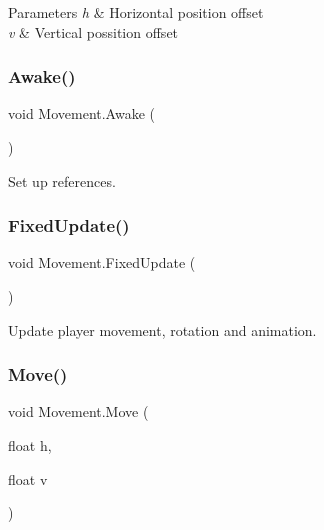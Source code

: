 \begin{DoxyParams}{Parameters}
{\em h} & Horizontal position offset \\
\hline
{\em v} & Vertical possition offset \\
\hline
\end{DoxyParams}
\mbox{\label{class_movement_acaad80b2d3b95e5998f7470405b6cad4}} 
\subsubsection{\texorpdfstring{Awake()}{Awake()}}
{\footnotesize\ttfamily void Movement.\+Awake (\begin{DoxyParamCaption}{ }\end{DoxyParamCaption})\hspace{0.3cm}{\ttfamily [private]}}



Set up references. 

\mbox{\label{class_movement_a9687a887cb7ae16793f2fdc42d00d11c}} 
\subsubsection{\texorpdfstring{FixedUpdate()}{FixedUpdate()}}
{\footnotesize\ttfamily void Movement.\+Fixed\+Update (\begin{DoxyParamCaption}{ }\end{DoxyParamCaption})\hspace{0.3cm}{\ttfamily [private]}}



Update player movement, rotation and animation. 

\mbox{\label{class_movement_abf363d8647ed3dc7882084132b08a32f}} 
\subsubsection{\texorpdfstring{Move()}{Move()}}
{\footnotesize\ttfamily void Movement.\+Move (\begin{DoxyParamCaption}\item[{float}]{h,  }\item[{float}]{v }\end{DoxyParamCaption})\hspace{0.3cm}{\ttfamily [private]}}



